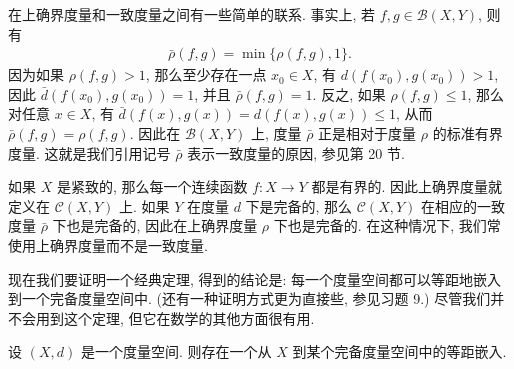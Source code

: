 \documentclass[../../main.tex]{subfiles}
\begin{document}
在上确界度量和一致度量之间有一些简单的联系. 事实上, 若 $f,g\in\mathcal{B}(X,Y)$, 则有
\begin{align*}
\bar{\rho}(f,g)=\min\{\rho(f,g),1\}.
\end{align*}
因为如果 $\rho(f,g)>1$, 那么至少存在一点 $x_0\in X$, 有 $d(f(x_0),g(x_0))>1$, 因此 $\bar{d}(f(x_0),g(x_0))=1$, 并且 $\bar{\rho}(f,g)=1$. 反之, 如果 $\rho(f,g)\leqslant 1$, 那么对任意 $x\in X$, 有 $\bar{d}(f(x),g(x))=d(f(x),g(x))\leqslant 1$, 从而 $\bar{\rho}(f,g)=\rho(f,g)$. 因此在 $\mathcal{B}(X,Y)$ 上, 度量 $\bar{\rho}$ 正是相对于度量 $\rho$ 的标准有界度量. 这就是我们引用记号 $\bar{\rho}$ 表示一致度量的原因, 参见第 20 节.

如果 $X$ 是紧致的, 那么每一个连续函数 $f\colon X\to Y$ 都是有界的. 因此上确界度量就定义在 $\mathcal{C}(X,Y)$ 上. 如果 $Y$ 在度量 $d$ 下是完备的, 那么 $\mathcal{C}(X,Y)$ 在相应的一致度量 $\bar{\rho}$ 下也是完备的, 因此在上确界度量 $\rho$ 下也是完备的. 在这种情况下, 我们常使用上确界度量而不是一致度量.

现在我们要证明一个经典定理, 得到的结论是: 每一个度量空间都可以等距地嵌入到一个完备度量空间中. (还有一种证明方式更为直接些, 参见习题 9.) 尽管我们并不会用到这个定理, 但它在数学的其他方面很有用.

\begin{theorem}\label{theorem:ch07-isometric-embedding}
设 $(X,d)$ 是一个度量空间. 则存在一个从 $X$ 到某个完备度量空间中的等距嵌入.
\end{theorem}
\end{document}
